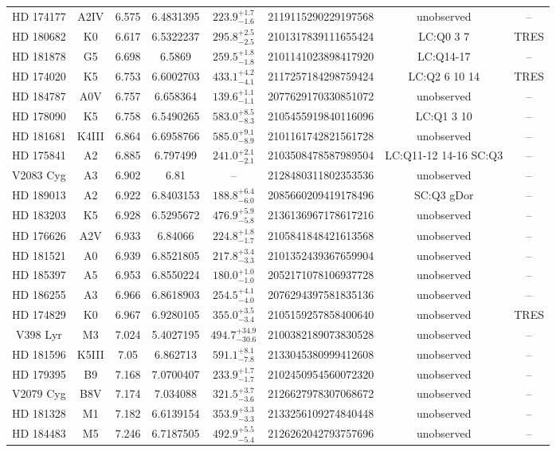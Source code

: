 \begin{table*}
\begin{tabular}{cccccccc}
HD 174177 & A2IV & 6.575 & 6.4831395 & $223.9^{+1.7}_{-1.6}$ & 2119115290229197568 & unobserved & -- \\
HD 180682 & K0 & 6.617 & 6.5322237 & $295.8^{+2.5}_{-2.5}$ & 2101317839111655424 & LC:Q0 3 7 & TRES \\
HD 181878 & G5 & 6.698 & 6.5869 & $259.5^{+1.8}_{-1.8}$ & 2101141023898417920 & LC:Q14-17 & -- \\
HD 174020 & K5 & 6.753 & 6.6002703 & $433.1^{+4.2}_{-4.1}$ & 2117257184298759424 & LC:Q2 6 10 14 & TRES \\
HD 184787 & A0V & 6.757 & 6.658364 & $139.6^{+1.1}_{-1.1}$ & 2077629170330851072 & unobserved & -- \\
HD 178090 & K5 & 6.758 & 6.5490265 & $583.0^{+8.5}_{-8.3}$ & 2105455919840116096 & LC:Q1 3 10 & -- \\
HD 181681 & K4III & 6.864 & 6.6958766 & $585.0^{+9.1}_{-8.9}$ & 2101161742821561728 & unobserved & -- \\
HD 175841 & A2 & 6.885 & 6.797499 & $241.0^{+2.1}_{-2.1}$ & 2103508478587989504 & LC:Q11-12 14-16 SC:Q3 & -- \\
V2083 Cyg & A3 & 6.902 & 6.81 & -- & 2128480311802353536 & unobserved & -- \\
HD 189013 & A2 & 6.922 & 6.8403153 & $188.8^{+6.4}_{-6.0}$ & 2085660209419178496 & SC:Q3 gDor & -- \\
HD 183203 & K5 & 6.928 & 6.5295672 & $476.9^{+5.9}_{-5.8}$ & 2136136967178617216 & unobserved & -- \\
HD 176626 & A2V & 6.933 & 6.84066 & $224.8^{+1.8}_{-1.7}$ & 2105841848421613568 & unobserved & -- \\
HD 181521 & A0 & 6.939 & 6.8521805 & $217.8^{+3.4}_{-3.3}$ & 2101352439367659904 & unobserved & -- \\
HD 185397 & A5 & 6.953 & 6.8550224 & $180.0^{+1.0}_{-1.0}$ & 2052171078106937728 & unobserved & -- \\
HD 186255 & A3 & 6.966 & 6.8618903 & $254.5^{+4.1}_{-4.0}$ & 2076294397581835136 & unobserved & -- \\
HD 174829 & K0 & 6.967 & 6.9280105 & $355.0^{+3.5}_{-3.4}$ & 2105159257858400640 & unobserved & TRES \\
V398 Lyr & M3 & 7.024 & 5.4027195 & $494.7^{+34.9}_{-30.6}$ & 2100382189073830528 & unobserved & -- \\
HD 181596 & K5III & 7.05 & 6.862713 & $591.1^{+8.1}_{-7.8}$ & 2133045380999412608 & unobserved & -- \\
HD 179395 & B9 & 7.168 & 7.0700407 & $233.9^{+1.7}_{-1.7}$ & 2102450954560072320 & unobserved & -- \\
V2079 Cyg & B8V & 7.174 & 7.034088 & $321.5^{+3.7}_{-3.6}$ & 2126627978307068672 & unobserved & -- \\
HD 181328 & M1 & 7.182 & 6.6139154 & $353.9^{+3.3}_{-3.3}$ & 2133256109274840448 & unobserved & -- \\
HD 184483 & M5 & 7.246 & 6.7187505 & $492.9^{+5.5}_{-5.4}$ & 2126262042793757696 & unobserved & -- \\
\hline
\end{tabular}
\end{table*}
